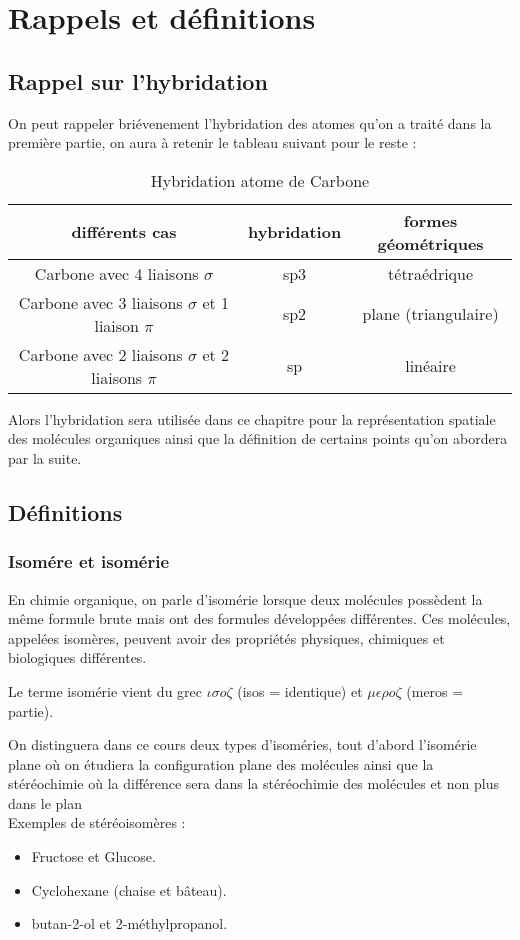 \documentclass[a4paper, oneside]{book}
\begin{document}
\chapter{Rappels et définitions}
\minitoc
\section{Rappel sur l'hybridation}
On peut rappeler briévenement l'hybridation des atomes qu'on a traité dans la première partie, on aura à retenir le tableau suivant pour le reste : 
\begin{table}[!h]
    \centering
   \begin{tabular}{|c|c|c|}
    \hline
    \textbf{différents cas} & \textbf{hybridation} &  \textbf{formes géométriques} \\
    \hline
    Carbone avec 4 liaisons $\sigma$ & sp3 & tétraédrique\\
    \hline
    Carbone avec 3 liaisons $\sigma$ et 1 liaison $\pi$ & sp2 & plane (triangulaire)\\
    \hline
    Carbone avec 2 liaisons $\sigma$  et 2 liaisons $\pi$ & sp & linéaire\\
    \hline
\end{tabular} 
    \caption{Hybridation atome de Carbone}
    \label{Figure 2}
\end{table}

Alors l'hybridation sera utilisée dans ce chapitre pour la représentation spatiale des molécules organiques ainsi que la définition de certains points qu'on abordera par la suite.
\section{Définitions}
\subsection{Isomére et isomérie}
En chimie organique, on parle d'isomérie lorsque deux molécules possèdent la même formule brute mais ont des formules développées différentes. Ces molécules, appelées isomères, peuvent avoir des propriétés physiques, chimiques et biologiques différentes.

Le terme isomérie vient du grec $\iota\sigma o\zeta$ (isos = identique) et $\mu\epsilon\rho o\zeta$ (meros = partie).

On distinguera dans ce cours deux types d'isoméries, tout d'abord l'isomérie plane où on étudiera la configuration plane des molécules ainsi que la stéréochimie où la différence sera dans la stéréochimie des molécules et non plus dans le plan\\
Exemples de stéréoisomères :\\
\begin{itemize}
    \item Fructose et Glucose.
    \item Cyclohexane (chaise et bâteau).
     \item butan-2-ol et 2-méthylpropanol.
\end{itemize}
\end{document}

